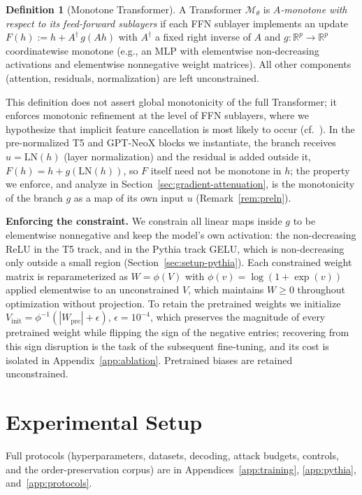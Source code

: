 \documentclass{article}
\theoremstyle{plain}
\theoremstyle{definition}
\newtheorem{definition}[theorem]{Definition}
\theoremstyle{remark}
\theoremstyle{plain}
\begin{document}
\begin{definition}[Monotone Transformer]
\label{def:mono_transformer}
A Transformer $\mathcal{M}_\theta$ is \emph{$A$-monotone with respect to its feed-forward sublayers}
if each FFN sublayer implements an update $F(h) := h + A^\dagger\, g(Ah)$ with $A^\dagger$ a fixed right inverse of $A$ and $g:\mathbb{R}^p\to\mathbb{R}^p$ coordinatewise monotone (e.g., an MLP with elementwise non-decreasing activations and elementwise nonnegative weight matrices). All other components (attention, residuals, normalization) are left unconstrained.
\end{definition}

This definition does not assert global monotonicity of the full Transformer; it enforces monotonic refinement at the level of FFN sublayers, where we hypothesize that implicit feature cancellation is most likely to occur (cf.~\citealp{runje2023constrained,sartor2025advancing,nguyen2023mononet}). In the pre-normalized T5 and GPT-NeoX blocks we instantiate, the branch receives $u = \mathrm{LN}(h)$ (layer normalization) and the residual is added outside it, $F(h) = h + g(\mathrm{LN}(h))$, so $F$ itself need not be monotone in $h$; the property we enforce, and analyze in Section~\ref{sec:gradient-attenuation}, is the monotonicity of the branch $g$ as a map of its own input $u$ (Remark~\ref{rem:preln}).

\textbf{Enforcing the constraint.}
We constrain all linear maps inside $g$ to be elementwise nonnegative and keep the model's own activation: the non-decreasing ReLU in the T5 track, and in the Pythia track GELU, which is non-decreasing only outside a small region (Section~\ref{sec:setup-pythia}). Each constrained weight matrix is reparameterized as $W = \phi(V)$ with $\phi(v) = \log(1+\exp(v))$ applied elementwise to an unconstrained $V$, which maintains $W \ge 0$ throughout optimization without projection. To retain the pretrained weights we initialize $V_{\mathrm{init}} = \phi^{-1}(|W_{\mathrm{pre}}| + \epsilon)$, $\epsilon = 10^{-4}$, which preserves the magnitude of every pretrained weight while flipping the sign of the negative entries; recovering from this sign disruption is the task of the subsequent fine-tuning, and its cost is isolated in Appendix~\ref{app:ablation}. Pretrained biases are retained unconstrained.

\section{Experimental Setup}
\label{sec:setup}
Full protocols (hyperparameters, datasets, decoding, attack budgets, controls, and the order-preservation corpus) are in Appendices~\ref{app:training}, \ref{app:pythia}, and~\ref{app:protocols}.
\end{document}
